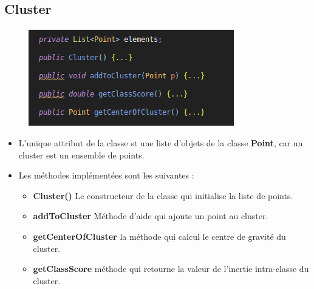 	\subsection*{Cluster}
		\paragraph{}
		\begin{figure}[H]
			\centering
			\includegraphics[width=0.75\linewidth]{dbscan/images/cluster/all.png}
		\end{figure}
		\begin{itemize}
			\item L'unique attribut de la classe st une liste d'objets de la classe \textbf{Point}, car un cluster est un ensemble de points.
			
			\item Les méthodes implémentées sont les suivantes : 
			\begin{itemize}
				\item \textbf{Cluster()} Le constructeur de la classe qui initialise la liste de points.
				\item \textbf{addToCluster} Méthode d'aide qui ajoute un point au cluster.
				\item \textbf{getCenterOfCluster} la méthode qui calcul le centre de gravité du cluster.
				\item \textbf{getClassScore} méthode qui retourne la valeur de l'inertie intra-classe du cluster.
			\end{itemize}
		\end{itemize}
	
